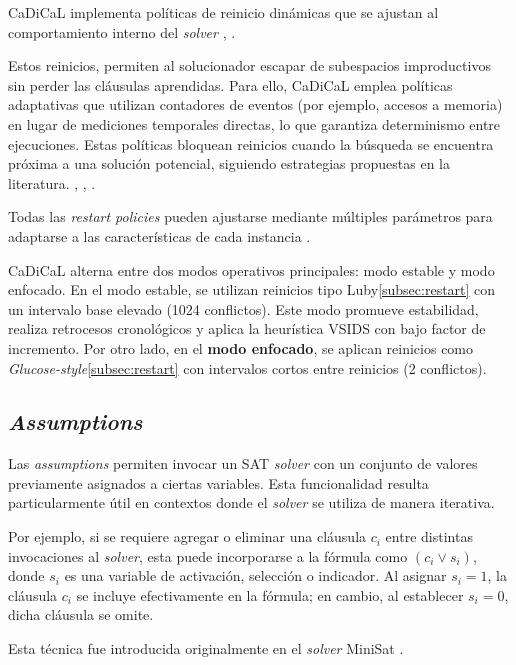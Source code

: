 CaDiCaL implementa políticas de reinicio dinámicas que se ajustan al comportamiento interno del \textit{solver} \cite{biere2019restart_schemes}, \cite{zhang2024revisiting}.

Estos reinicios, permiten al solucionador escapar de subespacios improductivos sin perder las cláusulas aprendidas. Para ello, CaDiCaL emplea políticas adaptativas que utilizan contadores de eventos (por ejemplo, accesos a memoria) en lugar de mediciones temporales directas, lo que garantiza determinismo entre ejecuciones. Estas políticas bloquean reinicios cuando la búsqueda se encuentra próxima a una solución potencial, siguiendo estrategias propuestas en la literatura. \cite{cherif2021combining}, \cite{biere2019restart_schemes}, \cite{zhang2024revisiting}.


Todas las \textit{restart policies} pueden ajustarse mediante múltiples parámetros para adaptarse a las características de cada instancia \cite{cai2022better_heuristics}.

CaDiCaL alterna entre dos modos operativos principales: modo estable y modo enfocado. En el modo estable, se utilizan reinicios tipo Luby\ref{subsec:restart} con un intervalo base elevado (1024 conflictos). Este modo promueve estabilidad, realiza retrocesos cronológicos y aplica la heurística VSIDS con bajo factor de incremento. Por otro lado, en el \textbf{modo enfocado}, se aplican reinicios como \textit{Glucose-style}\ref{subsec:restart} con intervalos cortos entre reinicios (2 conflictos).

\subsection{\textit{Assumptions}}
\label{subsec:cadical-assumptions}

Las \textit{assumptions} permiten invocar un SAT \textit{solver} con un conjunto de valores previamente asignados a ciertas variables. Esta funcionalidad resulta particularmente útil en contextos donde el \textit{solver} se utiliza de manera iterativa.

Por ejemplo, si se requiere agregar o eliminar una cláusula $c_i$ entre distintas invocaciones al \textit{solver}, esta puede incorporarse a la fórmula como $(c_i \lor s_i)$, donde $s_i$ es una variable de activación, selección o indicador. Al asignar $s_i = 1$, la cláusula $c_i$ se incluye efectivamente en la fórmula; en cambio, al establecer $s_i = 0$, dicha cláusula se omite.

Esta técnica fue introducida originalmente en el \textit{solver} MiniSat \cite{marques-silva2024cdcl}.

